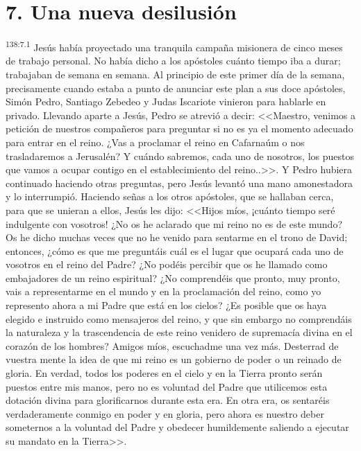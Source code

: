 \section*{7. Una nueva desilusión}
\par 
\textsuperscript{138:7.1} Jesús había proyectado una tranquila campaña misionera de cinco meses de trabajo personal. No había dicho a los apóstoles cuánto tiempo iba a durar; trabajaban de semana en semana. Al principio de este primer día de la semana, precisamente cuando estaba a punto de anunciar este plan a sus doce apóstoles, Simón Pedro, Santiago Zebedeo y Judas Iscariote vinieron para hablarle en privado. Llevando aparte a Jesús, Pedro se atrevió a decir: <<Maestro, venimos a petición de nuestros compañeros para preguntar si no es ya el momento adecuado para entrar en el reino. ¿Vas a proclamar el reino en Cafarnaúm o nos trasladaremos a Jerusalén? Y cuándo sabremos, cada uno de nosotros, los puestos que vamos a ocupar contigo en el establecimiento del reino..>>. Y Pedro hubiera continuado haciendo otras preguntas, pero Jesús levantó una mano amonestadora y lo interrumpió. Haciendo señas a los otros apóstoles, que se hallaban cerca, para que se unieran a ellos, Jesús les dijo: <<Hijos míos, ¡cuánto tiempo seré indulgente con vosotros! ¿No os he aclarado que mi reino no es de este mundo? Os he dicho muchas veces que no he venido para sentarme en el trono de David; entonces, ¿cómo es que me preguntáis cuál es el lugar que ocupará cada uno de vosotros en el reino del Padre? ¿No podéis percibir que os he llamado como embajadores de un reino espiritual? ¿No comprendéis que pronto, muy pronto, vais a representarme en el mundo y en la proclamación del reino, como yo represento ahora a mi Padre que está en los cielos? ¿Es posible que os haya elegido e instruido como mensajeros del reino, y que sin embargo no comprendáis la naturaleza y la trascendencia de este reino venidero de supremacía divina en el corazón de los hombres? Amigos míos, escuchadme una vez más. Desterrad de vuestra mente la idea de que mi reino es un gobierno de poder o un reinado de gloria. En verdad, todos los poderes en el cielo y en la Tierra pronto serán puestos entre mis manos, pero no es voluntad del Padre que utilicemos esta dotación divina para glorificarnos durante esta era. En otra era, os sentaréis verdaderamente conmigo en poder y en gloria, pero ahora es nuestro deber someternos a la voluntad del Padre y obedecer humildemente saliendo a ejecutar su mandato en la Tierra>>.


